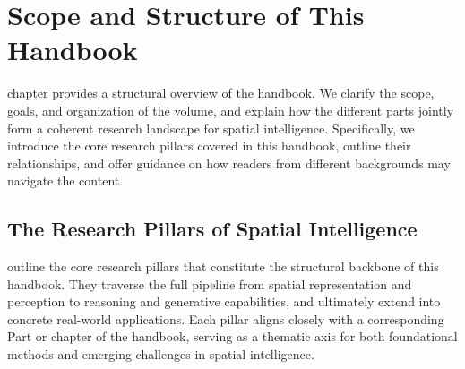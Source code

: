 
\chapter{Scope and Structure of This Handbook}
\label{chapter:structure}




chapter provides a structural overview of the handbook.
We clarify the scope, goals, and organization of the volume, and explain how the different parts jointly form a coherent research landscape for spatial intelligence.
Specifically, we introduce the core research pillars covered in this handbook, outline their relationships, and offer guidance on how readers from different backgrounds may navigate the content.






\section{The Research Pillars of Spatial Intelligence}
\label{sec:p1-sec3-the-research-pillars-of-spatial-intelligence}

outline the core research pillars that constitute the structural backbone of this handbook. 
They traverse the full pipeline from spatial representation and perception to reasoning and generative capabilities, and ultimately extend into concrete real-world applications. 
Each pillar aligns closely with a corresponding Part or chapter of the handbook, serving as a thematic axis for both foundational methods and emerging challenges in spatial intelligence.



